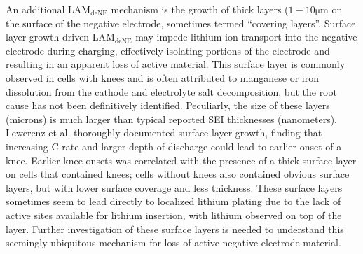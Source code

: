 \documentclass[journal=jpcl, manuscript=article, layout=onecolumn]{achemso}
\begin{document}
An additional $\mathrm{LAM_{deNE}}$ mechanism is the growth of thick layers ($1-10 \mathrm{\mu m}$ on the surface of the negative electrode, sometimes termed ``covering layers''\cite{lewerenz_post-mortem_2017, lewerenz_systematic_2017, willenberg_development_2020}.
Surface layer growth-driven $\mathrm{LAM_{deNE}}$ may impede lithium-ion transport into the negative electrode during charging, effectively isolating portions of the electrode and resulting in an apparent loss of active material. This surface layer is commonly observed in cells with knees and is often attributed to manganese or iron dissolution from the cathode and electrolyte salt decomposition, \cite{lewerenz_post-mortem_2017,lewerenz_systematic_2017,zhu_investigation_2021,stiaszny_electrochemical_2014,rahe_nanoscale_2019,keil_linear_2019,sarasketa-zabala_understanding_2015, willenberg_high-precision_2020} but the root cause has not been definitively identified. Peculiarly, the size of these layers (microns) is much larger than typical reported SEI thicknesses (nanometers)\cite{peled_reviewsei_2017}. Lewerenz et al.\cite{lewerenz_post-mortem_2017,lewerenz_systematic_2017} thoroughly documented surface layer growth, finding that increasing C-rate and larger depth-of-discharge could lead to earlier onset of a knee. Earlier knee onsets was correlated with the presence of a thick surface layer on cells that contained knees; cells without knees also contained obvious surface layers, but with lower surface coverage and less thickness. These surface layers sometimes seem to lead directly to localized lithium plating due to the lack of active sites available for lithium insertion, with lithium observed on top of the layer.\cite{zhu_investigation_2021}
Further investigation of these surface layers is needed to understand this seemingly ubiquitous mechanism for loss of active negative electrode material.
\end{document}
